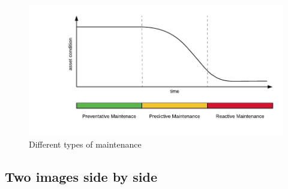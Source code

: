 \begin{figure}[H]
	\begin{center}
		\includegraphics[width=.9\textwidth, clip, trim=1cm 1cm 0.5cm 0.5cm]{Resources/Images/Images/Maintenance/maintenance_types.pdf}
	\end{center}
	\caption{Different types of maintenance}
	\label{fig:images:maintenance_types}
\end{figure}

\subsection{Two images side by side}
\label{sec:images:two_images}

